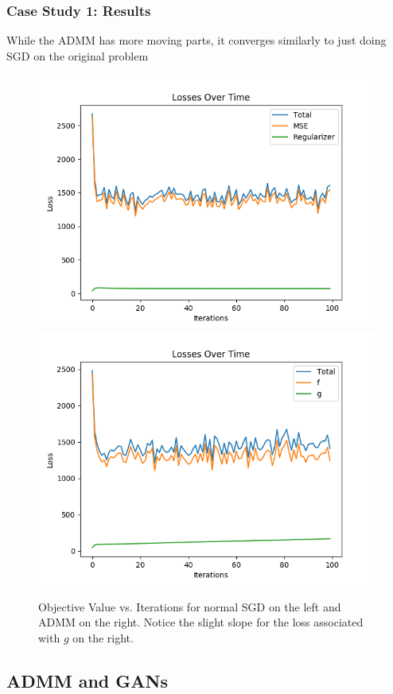\documentclass{beamer}
\begin{document}

\begin{frame}
\frametitle{Case Study 1: Results}
  While the ADMM has more moving parts, it converges similarly to just doing SGD on the original problem

  \begin{figure}
    \includegraphics[width=0.4\linewidth]{./images/toy_loss.png}
    \includegraphics[width=0.4\linewidth]{./images/toy_admm_loss.png}
    \caption{Objective Value vs. Iterations for normal SGD on the left and ADMM on the right. Notice the slight slope for the loss associated with $g$ on the right.}
  \end{figure}
\end{frame}


\subsection{ADMM and GANs}
\end{document}
